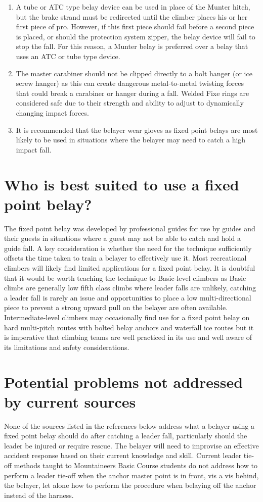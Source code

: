 \documentclass[nonacm,acmtog]{acmart}
\begin{document}
\begin{enumerate}
\item  A tube or ATC type belay device can be used in place of the Munter
hitch, but the brake strand must be redirected until the climber places his or
her first piece of pro. However, if this first piece should fail before a
second piece is placed, or should the protection system zipper, the belay
device will fail to stop the fall.  For this reason, a Munter belay is
preferred over a belay that uses an ATC or tube type device.

\item The master carabiner should not be clipped directly to a bolt hanger (or
ice screw hanger) as this can create dangerous metal-to-metal twisting forces
that could break a carabiner or hanger during a fall.  Welded Fixe rings are
considered safe due to their strength and ability to adjust to dynamically
changing impact forces.

\item It is recommended that the belayer wear gloves as fixed point belays are
most likely to be used in situations where the belayer may need to catch a high
impact fall.
\end{enumerate}

\section{Who is best suited to use a fixed point belay?}
The fixed point belay was developed by professional guides for use by guides
and their guests in situations where a guest may not be able to catch and hold
a guide fall. A key consideration is whether the need for the technique
sufficiently offsets the time taken to train a belayer to effectively use it.
Most recreational climbers will likely find limited applications for a fixed
point belay. It is doubtful that it would be worth teaching the technique to
Basic-level climbers as Basic climbs are generally low fifth class climbs where
leader falls are unlikely, catching a leader fall is rarely an issue and
opportunities to place a low multi-directional piece to prevent a strong upward
pull on the belayer are often available. Intermediate-level climbers may
occasionally find use for a fixed point belay on hard multi-pitch routes with
bolted belay anchors and waterfall ice routes but it is imperative that
climbing teams are well practiced in its use and well aware of its limitations
and safety considerations.

\section{Potential problems not addressed by current sources}
None of the sources listed in the references below address what a belayer using
a fixed point belay should do after catching a leader fall, particularly should
the leader be injured or require rescue. The belayer will need to improvise an
effective accident response based on their current knowledge and skill. Current
leader tie-off methods taught to Mountaineers Basic Course students do not
address how to perform a leader tie-off when the anchor master point is in
front, vis a vis behind, the belayer, let alone how to perform the procedure
when belaying off the anchor instead of the harness.
\end{document}
